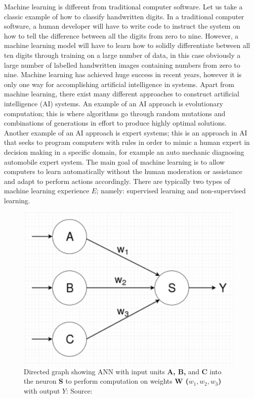 \documentclass[master]{thesis-uestc}
\begin{document}
Machine learning is different from traditional computer software. Let us take a classic example of how to classify handwritten digits. In a traditional computer software, a human developer will have to write code to instruct the system on how to tell the difference between all the digits from zero to nine. However, a machine learning model will have to learn how to solidly differentiate between all ten digits through training on a large number of data, in this case obviously a large number of labelled handwritten images containing numbers from zero to nine. Machine learning has achieved huge success in recent years, however it is only one way for accomplishing artificial intelligence in systems. Apart from machine learning, there exist many different approaches to construct artificial intelligence (AI) systems. An example of an AI approach is evolutionary computation; this is where algorithms go through random mutations and combinations of generations in effort to produce highly optimal solutions. Another example of an AI approach is expert systems; this is an approach in AI that seeks to program computers with rules in order to mimic a human expert in decision making in a specific domain, for example an auto mechanic diagnosing automobile expert system. The main goal of machine learning is to allow computers to learn automatically without the human moderation or assistance and adapt to perform actions accordingly. There are typically two types of machine learning experience $E$; namely: supervised learning and non-supervised learning.

\begin{figure}[ht]
\includegraphics[width=5in]{pic/neuron.png}
\caption{Directed graph showing ANN with input units \textbf{A, B,} and \textbf{C} into the neuron \textbf{S} to perform computation on weights \textbf{W ($w_1, w_2, w_3$)} with output \textbf{$Y$}: Source:}
\label{fig_neuron}
\end{figure}
\end{document}
